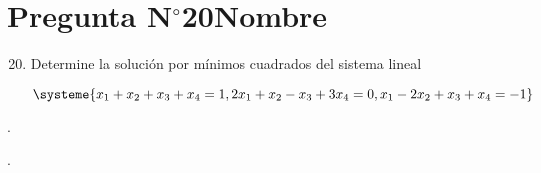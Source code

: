 \section{Pregunta N$^{\circ}$20\qquad Nombre}

\begin{frame}
	\begin{enumerate}\setcounter{enumi}{19}
		\item

		      Determine la solución por mínimos cuadrados del sistema
					lineal

		      \begin{equation*}
			      \systeme{
			      x_{1}+x_{2}+x_{3}+x_{4}=1,
			      2x_{1}+x_{2}-x_{3}+3x_{4}=0,
			      x_{1}-2x_{2}+x_{3}+x_{4}=-1
			      }
		      \end{equation*}
	\end{enumerate}

	\begin{solution}

		.
	\end{solution}
\end{frame}

\begin{frame}
	\begin{solution}

		.
	\end{solution}
\end{frame}